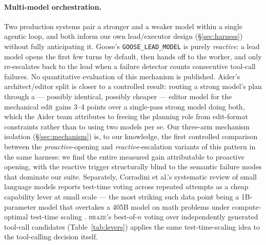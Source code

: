 \documentclass[smallcondensed,natbib]{svjour3}
\newcommand{\braze}{\textsc{braze}}
\begin{document}
\paragraph{Multi-model orchestration.} Two production systems pair a
stronger and a weaker model within a single agentic loop, and both
inform our own lead/executor design (\S\ref{sec:harness}) without fully
anticipating it. Goose's \texttt{GOOSE\_LEAD\_MODEL} \citep{goose} is
purely \emph{reactive}: a lead model opens the first few turns by
default, then hands off to the worker, and only re-escalates back to the
lead when a failure detector counts consecutive tool-call failures. No
quantitative evaluation of this mechanism is published. Aider's
architect/editor split \citep{aider} is closer to a controlled result:
routing a strong model's plan through a --- possibly identical, possibly
cheaper --- editor model for the mechanical edit gains 3--4 points over
a single-pass strong model doing both, which the Aider team attributes
to freeing the planning role from edit-format constraints rather than to
using two models per se. Our three-arm mechanism isolation
(\S\ref{sec:mechanism}) is, to our knowledge, the first controlled
comparison between the \emph{proactive}-opening and \emph{reactive}-escalation
variants of this pattern in the same harness: we find the entire
measured gain attributable to proactive opening, with the reactive
trigger structurally blind to the semantic failure modes that dominate
our suite. Separately, Corradini et al.'s systematic review of small
language models \citep{corradini2025} reports test-time voting across
repeated attempts as a cheap capability lever at small scale --- the
most striking such data point being a 1B-parameter model that overtakes
a 405B model on math problems under compute-optimal test-time scaling
\citep{liu2025tts}. \braze{}'s
best-of-$n$ voting over independently generated tool-call candidates
(Table~\ref{tab:levers}) applies the same test-time-scaling idea to the
tool-calling decision itself.
\end{document}
